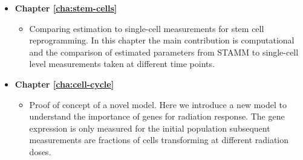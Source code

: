 \begin{itemize}
\begin{itemize}
\end{itemize}
\item {\bf Chapter \ref{cha:stem-cells}}
  \begin{itemize}
  \item Comparing estimation to single-cell measurements for stem cell reprogramming. In this chapter the main contribution is computational and the comparison of estimated parameters from STAMM to single-cell level measurements taken at different time points. 
  \end{itemize}
\item {\bf Chapter \ref{cha:cell-cycle}}
  \begin{itemize}
  \item Proof of concept of a novel model. Here we introduce a new model to understand the importance of genes for radiation response. The gene expression is only measured for the initial population subsequent measurements are fractions of cells transforming at different radiation doses. 
  \end{itemize}
\end{itemize}



